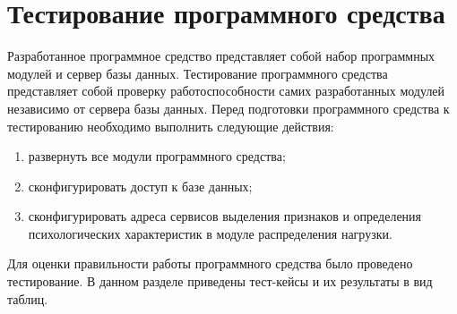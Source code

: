 \section{Тестирование программного средства}
\label{sec:testing}

Разработанное программное средство представляет собой набор программных модулей и сервер базы данных. Тестирование программного средства представляет собой проверку работоспособности самих разработанных модулей независимо от сервера базы данных. 
Перед подготовки программного средства к тестированию необходимо выполнить следующие действия:
\begin{enumerate}
  \item развернуть все модули программного средства;
  \item сконфигурировать доступ к базе данных;
  \item сконфигурировать адреса сервисов выделения признаков и определения психологических характеристик в модуле распределения нагрузки.
\end{enumerate}

Для оценки правильности работы программного средства было проведено тестирование. В данном разделе приведены тест-кейсы и их результаты в вид таблиц.

